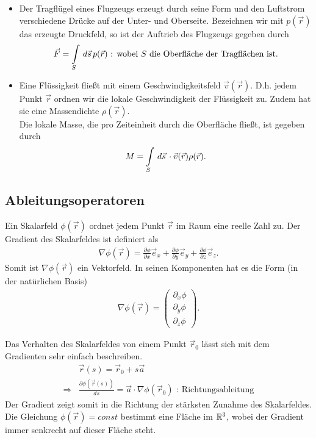 \begin{Beispiel}
\begin{itemize}
\item  Der Tragflügel eines Flugzeugs erzeugt durch seine Form und den Luftstrom
verschiedene Drücke auf der Unter- und Oberseite. Bezeichnen wir mit
$p(\vec{r})$ das erzeugte Druckfeld, so ist der Auftrieb des Flugzeugs gegeben
durch
\begin{align*}
\vec{F} = \int \limits_{S} \,d\vec{s}\,  p(\vec{r}) \text{ : wobei $S$ die
Oberfläche der Tragflächen ist.}
\end{align*}
\item Eine Flüssigkeit fließt mit einem Geschwindigkeitsfeld
$\vec{v}(\vec{r})$. D.h. jedem Punkt $\vec{r}$ ordnen wir die lokale
Geschwindigkeit der Flüssigkeit zu. Zudem hat sie eine Massendichte
$\rho(\vec{r})$.\\
Die lokale Masse, die pro Zeiteinheit durch die Oberfläche fließt, ist
gegeben durch
\begin{align*}
M = \int \limits_{S} \,d\vec{s}\, \cdot \vec{v}(\vec{r})\rho(\vec{r}).
\end{align*}
\end{itemize}
\end{Beispiel}

\subsection{Ableitungsoperatoren}
\begin{Definition}[Gradient]
Ein Skalarfeld $\phi(\vec{r})$ ordnet jedem Punkt $\vec{r}$ im Raum eine reelle
Zahl zu. Der Gradient des Skalarfeldes ist definiert als
\begin{align*}
\nabla \phi(\vec{r}) = \frac{\partial \phi}{\partial x}\vec{e}_x +
\frac{\partial \phi}{\partial y}\vec{e}_y + \frac{\partial \phi}{\partial
z}\vec{e}_z.
\end{align*}
Somit ist $\nabla \phi(\vec{r})$ ein Vektorfeld. In seinen Komponenten hat es
die Form (in der natürlichen Basis)
\begin{align*}
\nabla \phi(\vec{r}) = \begin{pmatrix}\partial_x\phi \\
\partial_y\phi \\ \partial_z\phi\end{pmatrix}.
\end{align*}
\end{Definition}

Das Verhalten des Skalarfeldes von einem Punkt $\vec{r}_0$ lässt sich mit dem
Gradienten sehr einfach beschreiben.
\begin{align*}
&\vec{r}(s) = \vec{r}_0 + s\vec{a}\\
\Rightarrow & \frac{\partial \phi(\vec{r}(s))}{ds} = \vec{a} \cdot \nabla
\phi(\vec{r}_0) \text{ : Richtungsableitung}
\end{align*}
Der Gradient zeigt somit in die Richtung der stärksten Zunahme des
Skalarfeldes.\\
Die Gleichung $\phi(\vec{r}) = const$ bestimmt eine Fläche im $\mathbb{R}^3$, wobei der
Gradient immer senkrecht auf dieser Fläche steht.\\

